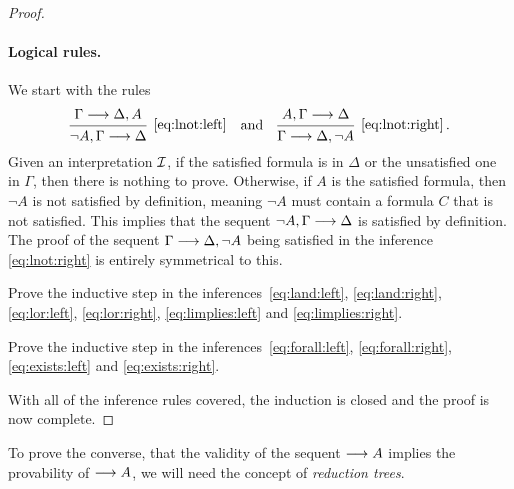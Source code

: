 \documentclass[11pt,a4paper]{article}
\begin{document}
\begin{proof}
    \paragraph{Logical rules.}
    We start with the rules
    \begin{equation*}
        \begin{prooftree}
            \hypo{\Gamma\seq\Delta,A}
            \infer1[\eqref{eq:lnot:left}]{\lnot A, \Gamma\seq\Delta}
        \end{prooftree}
        \quad\text{and}\quad
        \begin{prooftree}
            \hypo{A, \Gamma\seq\Delta}
            \infer1[\eqref{eq:lnot:right}]{\Gamma\seq\Delta, \lnot A}
        \end{prooftree}\,.
    \end{equation*}
    Given an interpretation \(\mathcal{I}\),
    if the satisfied formula is in \(\Delta\) or the unsatisfied
    one in \(\Gamma\), then there is nothing to prove.
    Otherwise, if \(A\) is the satisfied formula,
    then \(\lnot A\) is not satisfied by definition,
    meaning \(\lnot A\) must contain a formula \(C\) that is not satisfied.
    This implies that the sequent \(\lnot A,\Gamma\longrightarrow\Delta\) is satisfied by definition.
    The proof of the sequent \(\Gamma\longrightarrow\Delta,\lnot A\) being satisfied
    in the inference \eqref{eq:lnot:right} is entirely symmetrical to this.

    \begin{exercise}[Exercise 8.2.1]\label{exe:8.2.1}
        Prove the inductive step in the inferences~\eqref{eq:land:left},
        \eqref{eq:land:right}, \eqref{eq:lor:left}, \eqref{eq:lor:right},
        \eqref{eq:limplies:left} and \eqref{eq:limplies:right}.
    \end{exercise}

    \begin{exercise}[Exercise 8.2.2]\label{exe:8.2.2}
        Prove the inductive step in the inferences~\eqref{eq:forall:left},
        \eqref{eq:forall:right}, \eqref{eq:exists:left} and \eqref{eq:exists:right}.
    \end{exercise}

    With all of the inference rules covered,
    the induction is closed and the proof is now complete.
\end{proof}

To prove the converse, that the validity of the sequent \(\longrightarrow A\)
implies the provability of \(\longrightarrow A\), we will need the concept
of \emph{reduction trees}.
\end{document}
